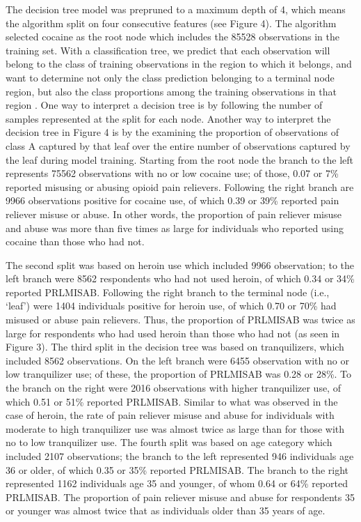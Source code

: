 \documentclass[sigconf]{acmart}
\begin{document}
The decision tree model was prepruned to a maximum depth of 4, which means 
the algorithm split on four consecutive features (see Figure 4). The  
algorithm selected cocaine as the root node which includes the 85528 
observations in the training set. With a classification tree, we predict 
that each observation will belong to the class of training observations in 
the region to which it belongs, and want to determine not only the class
prediction belonging to a terminal node region, but also the class 
proportions among the training observations in that region \cite{james13}. 
One way to interpret a decision tree is by following the number of samples 
represented at the split for each node. Another way to interpret the decision 
tree in Figure 4 is by the examining the proportion of observations of 
class A captured by that leaf over the entire number of observations captured 
by the leaf during model training. Starting from the root node the branch 
to the left represents 75562 observations with no or low cocaine use; 
of those, 0.07 or 7\% reported misusing or abusing opioid pain relievers. 
Following the right branch are 9966 observations positive for cocaine use, 
of which 0.39 or 39\% reported pain reliever misuse or abuse. In other words, 
the proportion of pain reliever misuse and abuse was more than five times as 
large for individuals who reported using cocaine than those who had not. 

The second split was based on heroin use which included 9966 observation; 
to the left branch were 8562 respondents who had not used heroin, of which
0.34 or 34\% reported PRLMISAB. Following the right branch to the terminal 
node (i.e., `leaf') were 1404 individuals positive for heroin use, of which
0.70 or 70\% had misused or abuse pain relievers. Thus, the proportion of 
PRLMISAB was twice as large for respondents who had used heroin than those 
who had not (as seen in Figure 3). The third split in the decision tree was 
based on tranquilizers, which included 8562 observations. On the left branch 
were 6455 observation with no or low tranquilizer use; of these, the 
proportion of PRLMISAB was 0.28 or 28\%. To the branch on the right were 
2016 observations with higher tranquilizer use, of which 0.51 or 51\% 
reported PRLMISAB. Similar to what was observed in the case of heroin, the 
rate of pain reliever misuse and abuse for individuals with moderate to high
tranquilizer use was almost twice as large than for those with no to low
tranquilizer use. The fourth split was based on age category which included
2107 observations; the branch to the left represented 946 individuals age 
36 or older, of which 0.35 or 35\% reported PRLMISAB. The branch to the 
right represented 1162 individuals age 35 and younger, of whom 0.64 or 64\% 
reported PRLMISAB. The proportion of pain reliever misuse and abuse for
respondents 35 or younger was almost twice that as individuals older 
than 35 years of age. 
\end{document}
